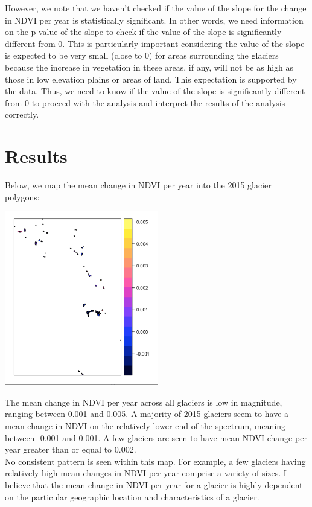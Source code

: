 \documentclass[11pt]{article}
\begin{document}
However, we note that we haven’t checked if the value of the slope for the change in NDVI per year is statistically
significant. In other words, we need information on the p-value of the slope to check if the value
of the slope is significantly different from 0. This is particularly important considering the value of
the slope is expected to be very small (close to 0) for areas surrounding the glaciers because
the increase in vegetation in these areas, if any, will not be as high as those in low elevation
plains or areas of land. This expectation is supported by the data. Thus, we need to know if the
value of the slope is significantly different from 0 to proceed with the analysis and interpret the
results of the analysis correctly.\\

\section*{Results}

Below, we map the mean change in NDVI per year into the 2015 glacier polygons:

\begin{center}
\includegraphics[height=3in]{q9.png}
\end{center}

The mean change in NDVI per year across all glaciers is low in magnitude, ranging
between 0.001 and 0.005. A majority of 2015 glaciers seem to have a mean change in NDVI on
the relatively lower end of the spectrum, meaning between -0.001 and 0.001. A few glaciers are
seen to have mean NDVI change per year greater than or equal to 0.002.\\

No consistent pattern is seen within this map. For example, a few glaciers having relatively high
mean changes in NDVI per year comprise a variety of sizes. I believe that the mean change in
NDVI per year for a glacier is highly dependent on the particular geographic location and
characteristics of a glacier.\\
\end{document}
